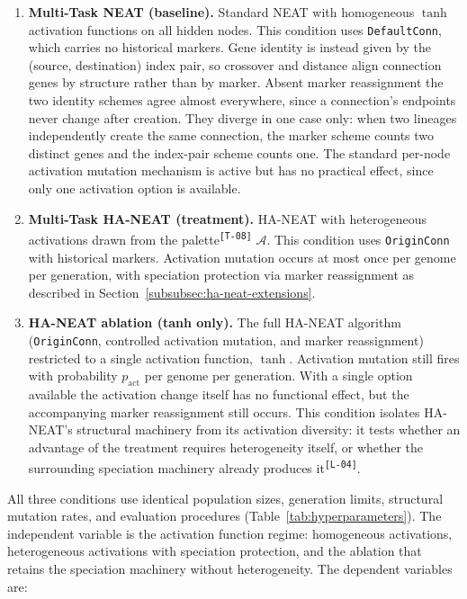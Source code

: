 \documentclass[12pt]{article}
\newcommand{\revID}[1]{\textsuperscript{\scriptsize\texttt{[#1]}}}
\newcommand{\revClarity}[2]{\textcolor{lrOrange}{#2}\revID{#1}} %
\newcommand{\revTerm}[2]{\textcolor{lrTeal}{#2}\revID{#1}}      %
\begin{document}
\begin{enumerate}
    \item \textbf{Multi-Task NEAT (baseline).} Standard NEAT with homogeneous $\tanh$ activation functions on all hidden nodes. This condition uses \texttt{DefaultConn}, which carries no historical markers. Gene identity is instead given by the (source, destination) index pair, so crossover and distance align connection genes by structure rather than by marker. Absent marker reassignment the two identity schemes agree almost everywhere, since a connection's endpoints never change after creation. They diverge in one case only: when two lineages independently create the same connection, the marker scheme counts two distinct genes and the index-pair scheme counts one. The standard per-node activation mutation mechanism is active but has no practical effect, since only one activation option is available.

    \item \textbf{Multi-Task HA-NEAT (treatment).} HA-NEAT with heterogeneous activations \revTerm{T-08}{drawn from the palette} $\mathcal{A}$. This condition uses \texttt{OriginConn} with historical markers. Activation mutation occurs at most once per genome per generation, with speciation protection via marker reassignment as described in Section~\ref{subsubsec:ha-neat-extensions}.

    \item \textbf{HA-NEAT ablation (tanh only).} The full HA-NEAT algorithm (\texttt{OriginConn}, controlled activation mutation, and marker reassignment) restricted to a single activation function, $\tanh$. Activation mutation still fires with probability $p_{\text{act}}$ per genome per generation. With a single option available the activation change itself has no functional effect, but the accompanying marker reassignment still occurs. This condition isolates HA-NEAT's structural machinery from its activation diversity: it tests whether an advantage of the treatment requires heterogeneity itself, \revClarity{L-04}{or whether the surrounding speciation machinery already produces it}.
\end{enumerate}

All three conditions use identical population sizes, generation limits, structural mutation rates, and evaluation procedures (Table~\ref{tab:hyperparameters}).
The independent variable is the activation function regime: homogeneous activations, heterogeneous activations with speciation protection, and the ablation that retains the speciation machinery without heterogeneity.
The dependent variables are:
\end{document}
